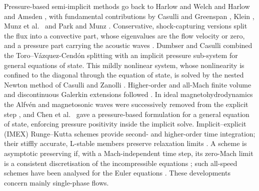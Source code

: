 Pressure-based semi-implicit methods go back to Harlow and Welch \cite{HarlowWelch1965} and Harlow and Amsden
\cite{HarlowAmsden1971}, with fundamental contributions by Casulli and Greenspan \cite{CasulliGreenspan1984}, Klein
\cite{Klein1995}, Munz et al.\ \cite{Munz2003} and Park and Munz \cite{ParkMunz2005}. Conservative, shock-capturing
versions split the flux into a convective part, whose eigenvalues are the flow velocity or zero, and a pressure part carrying the acoustic
waves \cite{ZhaBilgen1993,LiouSteffen1993,ToroVazquez2012}. Dumbser and Casulli \cite{DumbserCasulli2016} combined the
Toro--V\'azquez-Cend\'on splitting with an implicit pressure sub-system for general equations of state. This mildly
nonlinear system, whose nonlinearity is confined to the diagonal through the equation of state, is solved by the nested
Newton method of Casulli and Zanolli \cite{CasulliZanolli2012}. Higher-order and all-Mach finite volume and
discontinuous Galerkin extensions followed
\cite{TavelliDumbser2017,Boscheri2020,BoscheriPareschi2021,BoscheriTavelli2022,Boscarino2022,Orlando2022}. In ideal
magnetohydrodynamics the Alfv\'en and magnetosonic waves were successively removed from the explicit step
\cite{Dumbser2019,Fambri2021,BoscheriThomann2024,Dematte2024}, and Chen et al.\ \cite{Chen2026} gave a pressure-based
formulation for a general equation of state, enforcing pressure positivity inside the implicit solve. Implicit--explicit
(IMEX) Runge--Kutta schemes \cite{Ascher1997,PareschiRusso2005} provide second- and higher-order time integration; their
stiffly accurate, L-stable members preserve relaxation limits
\cite{PareschiRusso2005,BoscarinoRusso2009,BoscarinoPareschiRusso2017}. A scheme is asymptotic preserving if, with a
Mach-independent time step, its zero-Mach limit is a consistent discretisation of the incompressible equations
\cite{Jin1999,KlainermanMajda1981}; such all-speed schemes have been analysed for the Euler equations
\cite{DegondTang2011,HaackJinLiu2012,Cordier2012,Noelle2014,Dimarco2018,Boscheri2020}. These developments concern mainly
single-phase flows.

